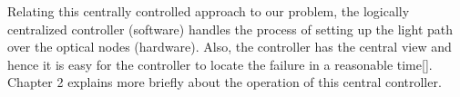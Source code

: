Relating this centrally controlled approach to our problem, the logically centralized controller (software) handles the process of setting up the light path over the optical nodes (hardware). Also, the controller has the central view and hence it is easy for the controller to locate the failure in a reasonable time[]. Chapter 2 explains more briefly about the operation of this central controller.

















  